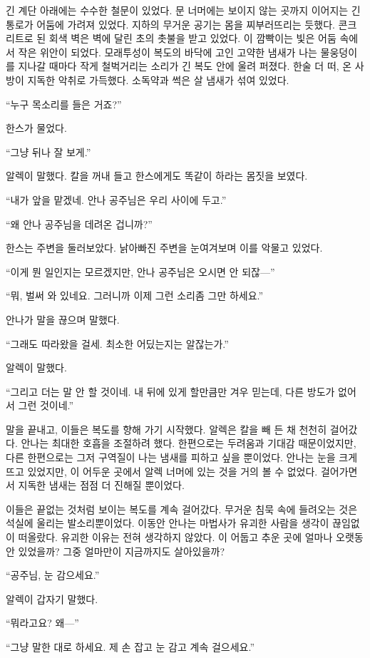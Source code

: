 긴 계단 아래에는 수수한 철문이 있었다. 문 너머에는 보이지 않는 곳까지 이어지는 긴 통로가 어둠에 가려져 있었다. 지하의 무거운 공기는 몸을 찌부러뜨리는 듯했다. 콘크리트로 된 회색 벽은 벽에 달린 초의 촛불을 받고 있었다. 이 깜빡이는 빛은 어둠 속에서 작은 위안이 되었다. 모래투성이 복도의 바닥에 고인 고약한 냄새가 나는 물웅덩이를 지나갈 때마다 작게 철벅거리는 소리가 긴 복도 안에 울려 퍼졌다. 한술 더 떠, 온 사방이 지독한 악취로 가득했다. 소독약과 썩은 살 냄새가 섞여 있었다.

``누구 목소리를 들은 거죠?''

한스가 물었다.

``그냥 뒤나 잘 보게.''

알렉이 말했다. 칼을 꺼내 들고 한스에게도 똑같이 하라는 몸짓을 보였다.

``내가 앞을 맡겠네. 안나 공주님은 우리 사이에 두고.''

``왜 안나 공주님을 데려온 겁니까?''

한스는 주변을 둘러보았다. 낡아빠진 주변을 눈여겨보며 이를 악물고 있었다.

``이게 뭔 일인지는 모르겠지만, 안나 공주님은 오시면 안 되잖—''

``뭐, 벌써 와 있네요. 그러니까 이제 그런 소리좀 그만 하세요.''

안나가 말을 끊으며 말했다.

``그래도 따라왔을 걸세. 최소한 어딨는지는 알잖는가.''

알렉이 말했다.

``그리고 더는 말 안 할 것이네. 내 뒤에 있게 할만큼만 겨우 믿는데, 다른 방도가 없어서 그런 것이네.''

말을 끝내고, 이들은 복도를 향해 가기 시작했다. 알렉은 칼을 빼 든 채 천천히 걸어갔다. 안나는 최대한 호흡을 조절하려 했다. 한편으로는 두려움과 기대감 때문이었지만, 다른 한편으로는 그저 구역질이 나는 냄새를 피하고 싶을 뿐이었다. 안나는 눈을 크게 뜨고 있었지만, 이 어두운 곳에서 알렉 너머에 있는 것을 거의 볼 수 없었다. 걸어가면서 지독한 냄새는 점점 더 진해질 뿐이었다.

이들은 끝없는 것처럼 보이는 복도를 계속 걸어갔다. 무거운 침묵 속에 들려오는 것은 석실에 울리는 발소리뿐이었다. 이동안 안나는 마법사가 유괴한 사람을 생각이 끊임없이 떠올랐다. 유괴한 이유는 전혀 생각하지 않았다. 이 어둡고 추운 곳에 얼마나 오랫동안 있었을까? 그중 얼마만이 지금까지도 살아있을까?

``공주님, 눈 감으세요.''

알렉이 갑자기 말했다.

``뭐라고요? 왜—''

``그냥 말한 대로 하세요. 제 손 잡고 눈 감고 계속 걸으세요.''

